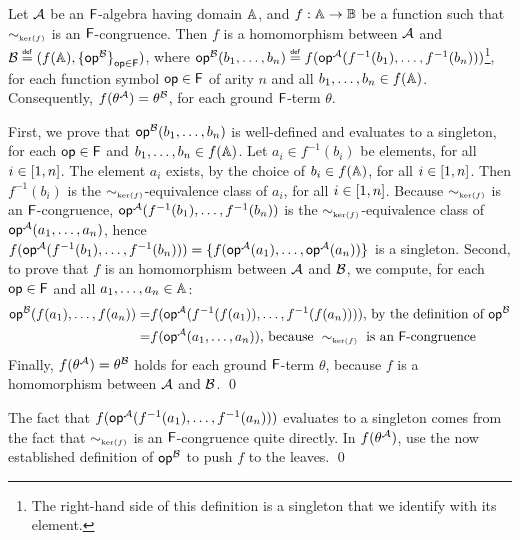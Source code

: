 \begin{propositionE}[][category=proofs]\label{prop:cong-homo}
  Let $\mathcal{A}$ be an $\mathsf{F}$-algebra having domain
  $\mathbb{A}$, and $f : \mathbb{A} \rightarrow
  \mathbb{B}$ be a function such that $\sim_{\scriptscriptstyle{\mathrm{ker}(f)}}$ is an
  $\mathsf{F}$-congruence. Then $f$ is a homomorphism between
  $\mathcal{A}$ and $\mathcal{B} \stackrel{\scriptscriptstyle{\mathsf{def}}}{=}
  (f(\mathbb{A}),{\{ {\mathsf{op}^{\mathcal{B}}} \}}_{\mathsf{op}\in\mathsf{F}})$, where
  $\mathsf{op}^{\mathcal{B}}(b_1,\ldots,b_n)\stackrel{\scriptscriptstyle{\mathsf{def}}}{=} f(\mathsf{op}^{\mathcal{A}}(f^{-1}(b_1),
  \ldots, f^{-1}(b_n)))$\footnote{The right-hand side of this
    definition is a singleton that we identify with its element.}, for
  each function symbol $\mathsf{op}\in\mathsf{F}$ of arity $n$ and all
  $b_1,\ldots,b_n\in f(\mathbb{A})$. Consequently,
  $f(\theta^{\mathcal{A}})=\theta^{\mathcal{B}}$, for each ground
  $\mathsf{F}$-term $\theta$.
\end{propositionE}
\begin{proofE}
  First, we prove that $\mathsf{op}^{\mathcal{B}}(b_1,\ldots,b_n)$ is
  well-defined and evaluates to a singleton, for each $\mathsf{op} \in
  \mathsf{F}$ and $b_1,\ldots,b_n \in f(\mathbb{A})$. Let $a_i \in
  f^{-1}(b_i)$ be elements, for all $i\in{[{1},{n}]}$. The element
  $a_i$ exists, by the choice of $b_i \in f(\mathbb{A})$, for all
  $i \in {[{1},{n}]}$. Then $f^{-1}(b_i)$ is the
  $\sim_{\scriptscriptstyle{\mathrm{ker}(f)}}$-equivalence class of $a_i$, for all
  $i\in{[{1},{n}]}$. Because $\sim_{\scriptscriptstyle{\mathrm{ker}(f)}}$ is an
  $\mathsf{F}$-congruence, $\mathsf{op}^{\mathcal{A}}(f^{-1}(b_1), \ldots,
  f^{-1}(b_n))$ is the $\sim_{\scriptscriptstyle{\mathrm{ker}(f)}}$-equivalence class of
  $\mathsf{op}^{\mathcal{A}}(a_1,\ldots,a_n)$, hence
  $f(\mathsf{op}^{\mathcal{A}}(f^{-1}(b_1), \ldots,
  f^{-1}(b_n)))={\{ {f(\mathsf{op}^{\mathcal{A}}(a_1), \ldots,
    \mathsf{op}^{\mathcal{A}}(a_n))} \}}$ is a singleton. Second, to prove that $f$
  is an homomorphism between $\mathcal{A}$ and $\mathcal{B}$, we compute,
  for each $\mathsf{op}\in\mathsf{F}$ and all
  $a_1,\ldots,a_n\in\mathbb{A}$:
  \begin{align*}
    \mathsf{op}^{\mathcal{B}}(f(a_1), \ldots, f(a_n)) = & f(\mathsf{op}^{\mathcal{A}}(f^{-1}(f(a_1)), \ldots, f^{-1}(f(a_n))))
    \text{, by the definition of } \mathsf{op}^{\mathcal{B}} \\
    = & f(\mathsf{op}^{\mathcal{A}}(a_1, \ldots, a_n)) \text{, because } \sim_{\scriptscriptstyle{\mathrm{ker}(f)}} \text{ is an $\mathsf{F}$-congruence}
  \end{align*}
  Finally, $f(\theta^{\mathcal{A}})=\theta^{\mathcal{B}}$ holds for each
  ground $\mathsf{F}$-term $\theta$, because $f$ is a homomorphism
  between $\mathcal{A}$ and $\mathcal{B}$. \qed
\end{proofE}
\begin{proofSketch}
  The fact that $f(\mathsf{op}^{\mathcal{A}}(f^{-1}(a_1),\ldots,f^{-1}(a_n)))$ evaluates to a singleton
  comes from the fact that $\sim_{\scriptscriptstyle{\mathrm{ker}(f)}}$ is an $\mathsf{F}$-congruence quite directly.
  In $f(\theta^{\mathcal{A}})$, use the now established definition of $\mathsf{op}^{\mathcal{B}}$
  to push $f$ to the leaves.
  \qed
\end{proofSketch}

